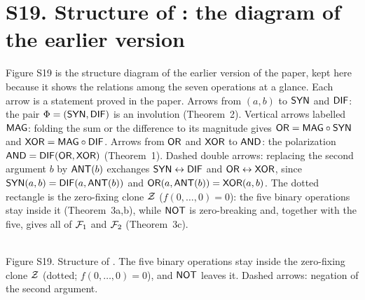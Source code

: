 \documentclass[10pt,a4paper]{article}
\begin{document}
\section*{S19. Structure of \chai{}: the diagram of the earlier version}
Figure S19 is the structure diagram of the earlier version of the paper, kept here because it shows the relations among the seven operations at a glance. Each arrow is a statement proved in the paper. Arrows from $(a,b)$ to $\mathsf{SYN}$ and $\mathsf{DIF}$: the pair $\Phi=(\mathsf{SYN},\mathsf{DIF})$ is an involution (Theorem~2). Vertical arrows labelled $\mathsf{MAG}$: folding the sum or the difference to its magnitude gives $\mathsf{OR}=\mathsf{MAG}\circ\mathsf{SYN}$ and $\mathsf{XOR}=\mathsf{MAG}\circ\mathsf{DIF}$. Arrows from $\mathsf{OR}$ and $\mathsf{XOR}$ to $\mathsf{AND}$: the polarization $\mathsf{AND}=\mathsf{DIF}(\mathsf{OR},\mathsf{XOR})$ (Theorem~1). Dashed double arrows: replacing the second argument $b$ by $\mathsf{ANT}(b)$ exchanges $\mathsf{SYN}\leftrightarrow\mathsf{DIF}$ and $\mathsf{OR}\leftrightarrow\mathsf{XOR}$, since $\mathsf{SYN}(a,b)=\mathsf{DIF}(a,\mathsf{ANT}(b))$ and $\mathsf{OR}(a,\mathsf{ANT}(b))=\mathsf{XOR}(a,b)$. The dotted rectangle is the zero-fixing clone $\mathcal Z$ ($f(0,\dots,0)=0$): the five binary operations stay inside it (Theorem~3a,b), while $\mathsf{NOT}$ is zero-breaking and, together with the five, gives all of $\mathcal F_1$ and $\mathcal F_2$ (Theorem~3c).
\begin{center}
\\[2pt]
{\small Figure S19. Structure of \chai{}. The five binary operations stay inside the zero-fixing clone $\mathcal Z$ (dotted; $f(0,\dots,0)=0$), and $\mathsf{NOT}$ leaves it. Dashed arrows: negation of the second argument.}
\end{center}
\end{document}
